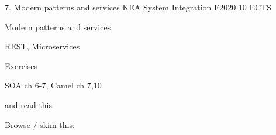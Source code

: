 \documentclass[Screen16to9,17pt]{foils}
\begin{document}
\mytitlepage
{7. Modern patterns and services}
{KEA System Integration F2020 10 ECTS}


\begin{list2}
\item Modern patterns and services
\item REST, Microservices
\item
\end{list2}

Exercises
\begin{list2}
\item
\item
\end{list2}




\begin{list1}
\item SOA ch 6-7, Camel ch 7,10

and read this\\

\item Browse / skim this:\\

\end{list1}




\slidenext
\end{document}
